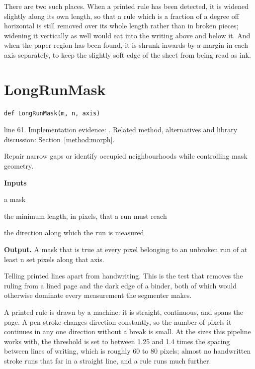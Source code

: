 There are two such places. When a printed rule has been detected, it is widened slightly along its own length, so that a rule which is a fraction of a degree off horizontal is still removed over its whole length rather than in broken pieces; widening it vertically as well would eat into the writing above and below it. And when the paper region has been found, it is shrunk inwards by a margin in each axis separately, to keep the slightly soft edge of the sheet from being read as ink.



\section{LongRunMask}\label{fn:segment:LongRunMask}
\begin{lstlisting}[style=sig]
def LongRunMask(m, n, axis)
\end{lstlisting}
 line 61. Implementation evidence: \cite{code2026}. Related method, alternatives and library discussion: Section~\ref{method:morph}.


Repair narrow gaps or identify occupied neighbourhoods while controlling mask geometry.




\noindent\textbf{Inputs}
\begin{description}[leftmargin=2.2em,style=nextline,font=\normalfont\ttfamily]\setlength\itemsep{1pt}
  \item[{m}] \normalfont a mask
  \item[{n}] \normalfont the minimum length, in pixels, that a run must reach
  \item[{axis}] \normalfont the direction along which the run is measured
\end{description}

\noindent\textbf{Output.} A mask that is true at every pixel belonging to an unbroken run of at least n set pixels along that axis.


Telling printed lines apart from handwriting. This is the test that removes the ruling from a lined page and the dark edge of a binder, both of which would otherwise dominate every measurement the segmenter makes.


A printed rule is drawn by a machine: it is straight, continuous, and spans the page. A pen stroke changes direction constantly, so the number of pixels it continues in any one direction without a break is small. At the sizes this pipeline works with, the threshold is set to between 1.25 and 1.4 times the spacing between lines of writing, which is roughly 60 to 80 pixels; almost no handwritten stroke runs that far in a straight line, and a rule runs much further.


